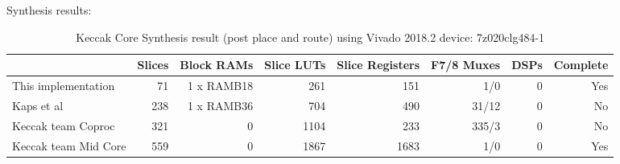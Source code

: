     Synthesis results:
    \begin{table}
        \begin{adjustbox}{width=1.2\textwidth,center=\textwidth}
            \begin{tabular}{l*{7}{r}}
                \rowcolor{DispositionColor!50}              %
                         {}            & Slices & Block RAMs &  Slice LUTs & Slice Registers & F7/8 Muxes & DSPs  & Complete \\ 
                \hline
                This implementation  & 71   &  1 x RAMB18  &  261        &    151         &      1/0    & 0     & Yes\\
                Kaps et al           & 238  &  1 x RAMB36  &  704        &    490         &      31/12  & 0     & No \\
                Keccak team Coproc   & 321  &  0           &  1104       &    233         &     335/3   & 0     & No \\
                Keccak team Mid Core & 559  &  0           &  1867       &    1683        &      1/0    & 0      & Yes \\
                 \hline
            \end{tabular}
            \end{adjustbox}
        \caption{Keccak Core Synthesis result (post place and route) using Vivado 2018.2 device: 7z020clg484-1}
        \label{table:synth_area}
        \end{table}